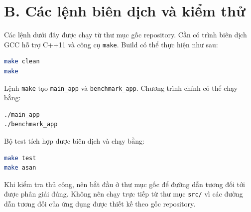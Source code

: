 \section*{B. Các lệnh biên dịch và kiểm thử}
Các lệnh dưới đây được chạy từ thư mục gốc repository. Cần có trình biên dịch GCC hỗ trợ C++11 và công cụ \texttt{make}. Build có thể thực hiện như sau:
\begin{lstlisting}[language=bash,caption={Biên dịch toàn bộ chương trình}]
make clean
make
\end{lstlisting}
Lệnh \texttt{make} tạo \texttt{main\_app} và \texttt{benchmark\_app}. Chương trình chính có thể chạy bằng:
\begin{lstlisting}[language=bash,caption={Chạy menu và chương trình benchmark}]
./main_app
./benchmark_app
\end{lstlisting}
Bộ test tích hợp được biên dịch và chạy bằng:
\begin{lstlisting}[language=bash,caption={Chạy các nhóm kiểm thử và tích hợp}]
make test
make asan
\end{lstlisting}
Khi kiểm tra thủ công, nên bắt đầu ở thư mục gốc để đường dẫn tương đối tới  được phân giải đúng. Không nên chạy trực tiếp từ thư mục \texttt{src/} vì các đường dẫn tương đối của ứng dụng được thiết kế theo gốc repository.

